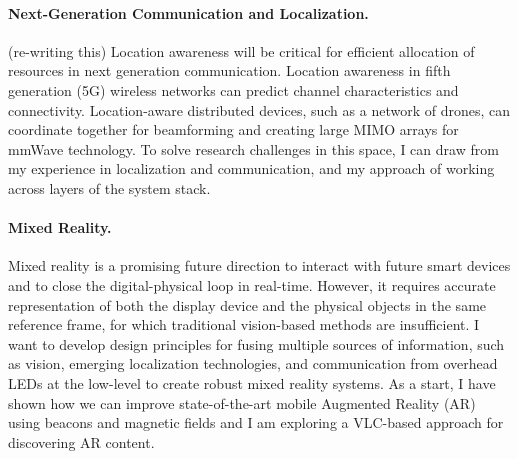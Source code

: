 \documentclass[10pt]{article}
\begin{document}
\paragraph{Next-Generation Communication and Localization. }
(re-writing this) Location awareness will be critical for efficient allocation of resources in next generation communication. 
Location awareness in fifth generation (5G) wireless networks can predict channel characteristics and connectivity. Location-aware distributed devices, such as a network of drones, can coordinate together for beamforming and creating large MIMO arrays for mmWave technology. To solve research challenges in this space, I can draw from my experience in localization and communication, and my approach of working across layers of the system stack. \\

\paragraph{Mixed Reality. }
Mixed reality is a promising future direction to interact with future smart devices and to close the digital-physical loop in real-time. However, it requires accurate representation of both the display device and the physical objects in the same reference frame, for which traditional vision-based methods are insufficient.
I want to develop design principles for fusing multiple sources of information, such as vision, emerging localization technologies, and communication from overhead LEDs at the low-level to create robust mixed reality systems. As a start, I have shown how we can improve state-of-the-art mobile Augmented Reality (AR) using beacons and magnetic fields \cite{mobileAR} and I am exploring a VLC-based approach for discovering AR content. 
\end{document}
